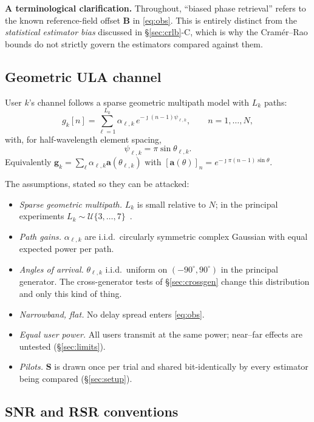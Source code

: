 \documentclass[journal]{IEEEtran}
\newcommand{\bS}{\mathbf{S}}
\newcommand{\bB}{\mathbf{B}}
\newcommand{\bg}{\mathbf{g}}
\newcommand{\jmathi}{\jmath}
\begin{document}
\textbf{A terminological clarification.} Throughout, ``biased phase retrieval''
refers to the known reference-field offset $\bB$ in \eqref{eq:obs}. This is
entirely distinct from the \emph{statistical estimator bias} discussed in
\S\ref{sec:crlb}-C, which is why the Cram\'er--Rao bounds do not strictly
govern the estimators compared against them.

\subsection{Geometric ULA channel}

User $k$'s channel follows a sparse geometric multipath model with $L_k$ paths:
\begin{equation}\label{eq:chan}
g_k[n]=\sum_{\ell=1}^{L_k}\alpha_{\ell,k}\,e^{-\jmathi(n-1)\psi_{\ell,k}},
\qquad n=1,\dots,N,
\end{equation}
with, for half-wavelength element spacing,
\begin{equation}\label{eq:psi}
\psi_{\ell,k}=\pi\sin\theta_{\ell,k}.
\end{equation}
Equivalently $\bg_k=\sum_\ell\alpha_{\ell,k}\mathbf{a}(\theta_{\ell,k})$ with
$[\mathbf{a}(\theta)]_n=e^{-\jmathi\pi(n-1)\sin\theta}$.

The assumptions, stated so they can be attacked:
\begin{itemize}
\item \emph{Sparse geometric multipath.} $L_k$ is small relative to $N$; in the
principal experiments $L_k\sim\mathcal{U}\{3,\dots,7\}$~\cite{xu2025}.
\item \emph{Path gains.} $\alpha_{\ell,k}$ are i.i.d.\ circularly symmetric
complex Gaussian with equal expected power per path.
\item \emph{Angles of arrival.} $\theta_{\ell,k}$ i.i.d.\ uniform on
$(-90^\circ,90^\circ)$ in the principal generator. The cross-generator tests of
\S\ref{sec:crossgen} change this distribution and only this kind of thing.
\item \emph{Narrowband, flat.} No delay spread enters \eqref{eq:obs}.
\item \emph{Equal user power.} All users transmit at the same power; near--far
effects are untested (\S\ref{sec:limits}).
\item \emph{Pilots.} $\bS$ is drawn once per trial and shared bit-identically
by every estimator being compared (\S\ref{sec:setup}).
\end{itemize}

\subsection{SNR and RSR conventions}
\end{document}

